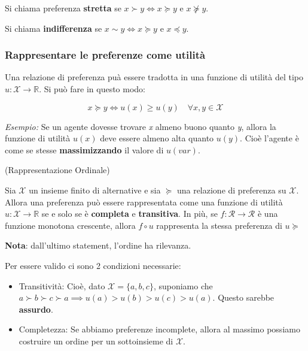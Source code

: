 Si chiama preferenza \textbf{stretta} se $x \succ y \iff x \succcurlyeq y$ e $x
    \nsucceq y$.

Si chiama \textbf{indifferenza} se $x \sim y \iff x \succcurlyeq y$ e $x
    \preccurlyeq y$.

\subsubsection{Rappresentare le preferenze come \textbf{utilità}}

Una relazione di preferenza puà essere tradotta in una funzione di utilità del
tipo $u: \mathcal{X} \rightarrow \mathbb{R}$. Si può fare in questo modo:

\begin{equation}
    x \succcurlyeq y \iff u(x) \geq u(y) \quad \forall x,y \in \mathcal{X}
\end{equation}

\textit{Esempio:} Se un agente dovesse trovare \textit{x} almeno buono quanto \textit{y}, allora la funzione di utilità $u(x)$ deve essere almeno
alta quanto $u(y)$. Cioè l'agente è come se stesse \textbf{massimizzando} il valore di $u(var)$.

\begin{theorem}(Rappresentazione Ordinale)

    Sia $\mathcal{X}$ un insieme finito di alternative e sia $\succcurlyeq$ una
    relazione di preferenza su $\mathcal{X}$. Allora una preferenza può essere
    rappresentata come una funzione di utilità $u: \mathcal{X} \rightarrow
        \mathbb{R}$ se e solo se è \textbf{completa} e \textbf{transitiva}. In più, se
    $f:\mathcal{R} \rightarrow \mathcal{R}$ è una funzione monotona crescente,
    allora $f \circ u$ rappresenta la stessa preferenza di $u \succcurlyeq$

    \textbf{Nota}: dall'ultimo statement, l'ordine ha rilevanza.

    Per essere valido ci sono 2 condizioni necessarie:
    \begin{itemize}
        \item Transitività: Cioè, dato $\mathcal{X} = \{a,b,c\}$, suponiamo che $a \succ b
                  \succ c \succ a \implies u(a) > u(b) > u(c) > u(a)$. Questo sarebbe
              \textbf{assurdo}.
        \item Completezza: Se abbiamo preferenze incomplete, allora al massimo possiamo
              costruire un ordine per un sottoinsieme di $\mathcal{X}$.
    \end{itemize}
\end{theorem}

